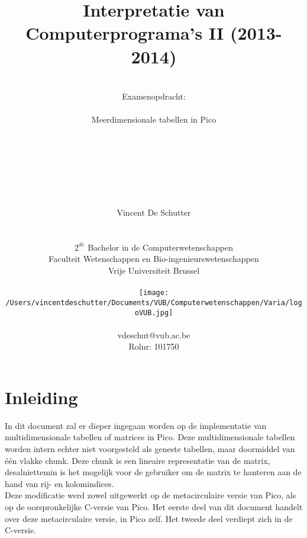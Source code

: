 \documentclass[a4paper,10pt,titlepage]{article}
\begin{document}
\title{\Huge Interpretatie van Computerprograma's II (2013-2014)}
\date{}
\author{ \\ \Huge Examenopdracht:  \\ \\ 
			\Huge Meerdimensionale tabellen in Pico \\ \\ \\ \\ \\  \\ \\ \\
				Vincent De Schutter\\ \\ \\
					$2^{de}$ Bachelor in de Computerwetenschappen \\
					Faculteit Wetenschappen en Bio-ingenieurswetenschappen
						\\Vrije Universiteit Brussel
						\\ \\ \texttt{[image: /Users/vincentdeschutter/Documents/VUB/Computerwetenschappen/Varia/logoVUB.jpg]}
        						\\ \\{vdeschut{@}vub.ac.be}
        						\\  {\normalsize Rolnr: 101750}}


\maketitle


\tableofcontents


\section{Inleiding}

In dit document zal er dieper ingegaan worden op de implementatie van multidimensionale tabellen of matrices in Pico. Deze multidimensionale tabellen worden intern echter niet voorgesteld als geneste tabellen, maar doormiddel van \'e\'en vlakke chunk. Deze chunk is een lineaire representatie van de matrix, desalniettemin is het mogelijk voor de gebruiker om de matrix te hanteren aan de hand van rij- en kolomindices. \\
Deze modificatie werd zowel uitgewerkt op de metacirculaire versie van Pico, als op de oorspronkelijke C-versie van Pico. Het eerste deel van dit document handelt over deze metacirculaire versie, in Pico zelf. Het tweede deel verdiept zich in de C-versie.
\end{document}
